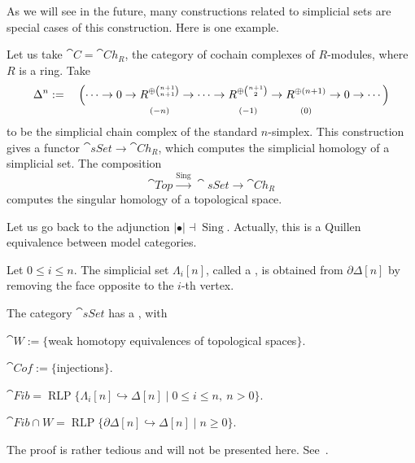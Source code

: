 As we will see in the future,
many constructions related to simplicial sets are special cases of this construction.
Here is one example.

\begin{example}
    Let us take $\cat{C}=\cat{Ch}_R$, the category of cochain complexes of $R$-modules,
    where $R$ is a ring. Take
    \[\Delta^n:=\quad\Bigl(\cdots\to0\to
    \underset{\substack{\\[.5em](-n)}}{R^{\oplus\binom{n+1}{n+1}}}\to
    \cdots\to
    \underset{\substack{\\[.5em](-1)}}{R^{\oplus\binom{n+1}{2}}}\to
    \underset{\substack{\\[.5em](0)}}{R^{\oplus(n+1)}}\to0\to\cdots\Bigr)\]
    to be the simplicial chain complex of the standard $n$-simplex.
    This construction gives a functor $\cat{sSet}\to\cat{Ch}_R$,
    which computes the simplicial homology of a simplicial set.
    The composition
    \[\cat{Top}\xrightarrow{\operatorname{Sing}}\cat{sSet}\to\cat{Ch}_R\]
    computes the singular homology of a topological space. \varqed
\end{example}

Let us go back to the adjunction $|{\bullet}|\dashv\operatorname{Sing}$.
Actually, this is a Quillen equivalence between model categories.

\begin{definition}
    Let $0\leq i\leq n$.
    The simplicial set $\Lambda_i[n]$, called a ,
    is obtained from $\partial\Delta[n]$ by removing the face opposite to the $i$-th vertex.
\end{definition}

\begin{theorem}
    The category $\cat{sSet}$ has a , with
    \begin{itms}
        \item $\cat W:=\{$weak homotopy equivalences of topological spaces$\}$.
        \item $\cat{Cof}:=\{$injections$\}$.
        \item $\cat{Fib}=\operatorname{RLP}\{\Lambda_i[n]\hookrightarrow\Delta[n]\mid0\leq i\leq n,\ n>0\}$.
        \item $\cat{Fib\cap W}=\operatorname{RLP}\{\partial\Delta[n]\hookrightarrow\Delta[n]\mid n\geq0\}$.
    \end{itms}
\end{theorem}

The proof is rather tedious and will not be presented here.
See~\cite[Theorem~3.6.5]{hovey}.

